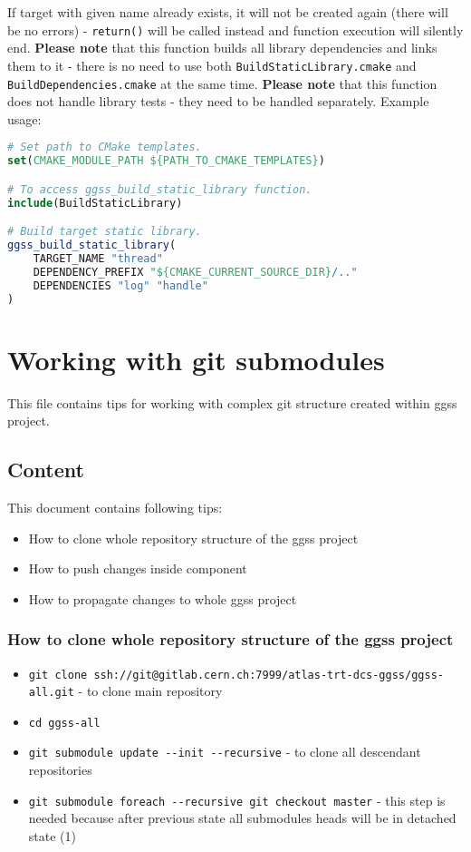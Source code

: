 \noindent
If target with given name already exists, it will not be created again (there will be no errors) - \lstinline{return()} will be called instead and function execution will silently end. \textbf{Please note} that this function builds all library dependencies and links them to it - there is no need to use both \lstinline{BuildStaticLibrary.cmake} and \lstinline{BuildDependencies.cmake} at the same time. \textbf{Please note} that this function does not handle library tests - they need to be handled separately. Example usage:

\begin{lstlisting}[language=CMake]
# Set path to CMake templates.
set(CMAKE_MODULE_PATH ${PATH_TO_CMAKE_TEMPLATES})

# To access ggss_build_static_library function.
include(BuildStaticLibrary)

# Build target static library.
ggss_build_static_library(
    TARGET_NAME "thread"
    DEPENDENCY_PREFIX "${CMAKE_CURRENT_SOURCE_DIR}/.." 
    DEPENDENCIES "log" "handle"
)
\end{lstlisting}

\clearpage
\section{Working with git submodules}
\label{sec:working-with-git-sudmobules}
This file contains tips for working with complex git structure created within ggss project.

\subsection*{Content}
This document contains following tips:
\begin{itemize}
    \item How to clone whole repository structure of the ggss project
    \item How to push changes inside component
    \item How to propagate changes to whole ggss project
\end{itemize}

\subsubsection*{How to clone whole repository structure of the ggss project}
\begin{itemize}
    \item \lstinline{git clone ssh://git@gitlab.cern.ch:7999/atlas-trt-dcs-ggss/ggss-all.git} - to clone main repository
    \item \lstinline{cd ggss-all}
    \item \lstinline{git submodule update --init --recursive} - to clone all descendant repositories
    \item \lstinline{git submodule foreach --recursive git checkout master} - this step is needed because after previous state all submodules heads will be in detached state (1)
\end{itemize}

